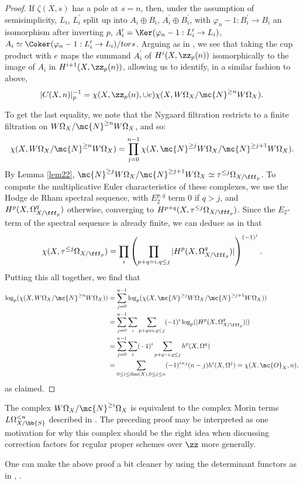 \begin{proof}
If $\zeta(X,s)$ has a pole at $s=n$, then, under the assumption of semisimplicity, $L_i$, $L_i^{\prime}$ split up into $A_i\oplus B_i$, $A_i^{\prime}\oplus B_i^{\prime}$, with $\varphi_n-1:B_i^{\prime}\to B_i$ an isomorphism after inverting $p$, $A_i^{\prime}=\Ker(\varphi_n-1:L_i^{\prime}\to L_i)$, $A_i\simeq\Coker(\varphi_n-1:L_i^{\prime}\to L_i)/tors$.  Arguing as in \cite{Schneider1982}, we see that taking the cup product with $e$ maps the summand $A_i^{\prime}$ of $H^i(X,\zz_p(n))$ isomorphically to the image of $A_i$ in $H^{i+1}(X,\zz_p(n))$, allowing us to identify, in a similar fashion to above,  $$|C(X,n)|_{p}^{-1}=\chi(X,\zz_p(n),\cup e)\chi(X,W\Omega_X/\mc{N}^{\geq n}W\Omega_X).$$

To get the last equality, we note that the Nygaard filtration restricts to a finite filtration on $W\Omega_X/\mc{N}^{\geq n}W\Omega_X$, and so:
$$\chi(X,W\Omega_X/\mc{N}^{\geq n}W\Omega_X)=\prod_{j=0}^{n-1}\chi(X,\mc{N}^{\geq j}W\Omega_X/\mc{N}^{\geq j+1}W\Omega_X).$$  By Lemma \ref{lem22}, $\mc{N}^{\geq j}W\Omega_X/\mc{N}^{\geq j+1}W\Omega_X\simeq \tau^{\leq j}\Omega_{X/\fff_p}$.  To compute the multiplicative Euler characteristics of these complexes, we use the Hodge de Rham spectral sequence, with $E_2^{p,q}$ term $0$ if $q>j$, and $H^p(X,\Omega^q_{X/\fff_p})$ otherwise, converging to $H^{p+q}(X,\tau^{\leq j}\Omega_{X/\fff_p})$.  Since the $E_2$-term of the spectral sequence is already finite, we can deduce as in \cite{morin2014milnes} that $$\chi(X,\tau^{\leq j}\Omega_{X/\fff_p})=\prod_{i}\left(\prod_{p+q=i,q\leq j}|H^p(X,\Omega^q_{X/\fff_p})|\right)^{(-1)^i}.$$
Putting this all together, we find that
\begin{align*}
\log_{p}(\chi(X,W\Omega_X/\mc{N}^{\geq n}W\Omega_X))&=\sum_{j=0}^{n-1}\log_{p}(\chi(X,\mc{N}^{\geq j}W\Omega_X/\mc{N}^{\geq j+1}W\Omega_X))\\
&=\sum_{j=0}^{n-1}\sum_{i}\sum_{p+q=i,q\leq j}(-1)^{i}\log_{p}(|H^p(X,\Omega^q_{X/\fff_p})|)\\
&=\sum_{j=0}^{n-1}\sum_{i}(-1)^{i}\sum_{p+q=i,q\leq j}h^p(X,\Omega^q)\\
&=\sum_{0\leq i\leq \dim(X),0\leq j\leq n}(-1)^{i+j}(n-j)h^i(X,\Omega^j)=\chi(X,\mc{O}_X,n),
\end{align*}
as claimed.
\end{proof}
\begin{remark}
	The complex $W\Omega_X/\mc{N}^{\geq i}\Omega_X$ is equivalent to the complex Morin terms $L\Omega_{X/\bb{S}}^{<n}$ described in \cite{morin2021topological}.  The preceding proof may be interpreted as one motivation for why this complex should be the right idea when discussing correction factors for regular proper schemes over $\zz$ more generally.
\end{remark}
\begin{remark}
	One can make the above proof a bit cleaner by using the determinant functors as in \cite{morin2014milnes}, \cite{morinmilnes2}.
\end{remark}

